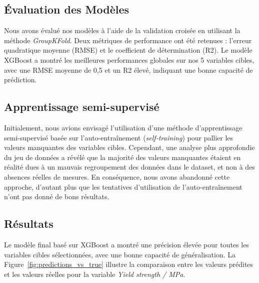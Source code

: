 \documentclass{article}
\begin{document}
\subsection{Évaluation des Modèles}

Nous avons évalué nos modèles à l’aide de la validation croisée en utilisant la méthode \textit{GroupKFold}. Deux métriques de performance ont été retenues : l’erreur quadratique moyenne (RMSE) et le coefficient de détermination (R2). Le modèle XGBoost a montré les meilleures performances globales sur nos 5 variables cibles, avec une RMSE moyenne de 0,5 et un R2 élevé, indiquant une bonne capacité de prédiction.

\subsection{Apprentissage semi-supervisé}

Initialement, nous avions envisagé l’utilisation d’une méthode d’apprentissage semi-supervisé basée sur l’auto-entraînement (\textit{self-training}) pour pallier les valeurs manquantes des variables cibles. Cependant, une analyse plus approfondie du jeu de données a révélé que la majorité des valeurs manquantes étaient en réalité dues à un mauvais regroupement des données dans le dataset, et non à des absences réelles de mesures. En conséquence, nous avons abandonné cette approche, d’autant plus que les tentatives d’utilisation de l’auto-entraînement n’ont pas donné de bons résultats.

\subsection{Résultats}

Le modèle final basé sur XGBoost a montré une précision élevée pour toutes les variables cibles sélectionnées, avec une bonne capacité de généralisation. La Figure~\ref{fig:predictions_vs_true} illustre la comparaison entre les valeurs prédites et les valeurs réelles pour la variable \textit{Yield strength / MPa}.
\end{document}
